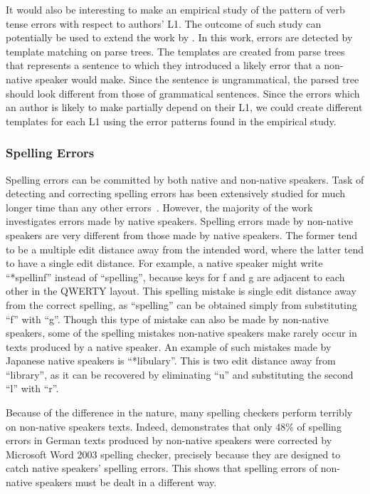 \documentclass[11pt]{article}
\begin{document}
It would also be interesting to make an empirical study of the pattern of verb 
tense errors with respect to authors' L1. The outcome of such study can 
potentially be used to extend the work by \cite{lee2008correcting}. In this 
work, errors are detected by template matching on parse trees. The templates are 
created from parse trees that represents a sentence to which they introduced a 
likely error that a non-native speaker would make. Since the sentence is 
ungrammatical, the parsed tree should look different from those of grammatical 
sentences. Since the errors which an author is likely to make partially depend 
on their L1, we could create different templates for each L1 using the error 
patterns found in the empirical study.

\subsubsection{Spelling Errors}
Spelling errors can be committed by both native and non-native speakers. Task of 
detecting and correcting spelling errors has been extensively studied for much 
longer time than any other errors~\citep{heift2007errors}. However, the majority 
of the work investigates errors made by native speakers. Spelling errors made by 
non-native speakers are very different from those made by native speakers. The 
former tend to be a multiple edit distance away from the intended word, where 
the latter tend to have a single edit distance. For example, a native speaker 
might write ``*spellinf'' instead of ``spelling'', because keys for f and g are 
adjacent to each other in the QWERTY layout. This spelling mistake is single 
edit distance away from the correct spelling, as ``spelling'' can be obtained 
simply from substituting ``f'' with ``g''. Though this type of mistake can also 
be made by non-native speakers, some of the spelling mistakes non-native 
speakers make rarely occur in texts produced by a native speaker. An example of 
such mistakes made by Japanese native speakers is ``*libulary''. This is two 
edit distance away from ``library'', as it can be recovered by eliminating ``u'' 
and substituting the second ``l'' with ``r''. 

Because of the difference in the nature, many spelling checkers perform terribly 
on non-native speakers texts. Indeed, \cite{rimrott2005language} demonstrates 
that only 48\% of spelling errors in German texts produced by non-native 
speakers were corrected by Microsoft Word 2003 spelling checker, precisely 
because they are designed to catch native speakers' spelling errors. This shows 
that spelling errors of non-native speakers must be dealt in a different way. 
\end{document}
